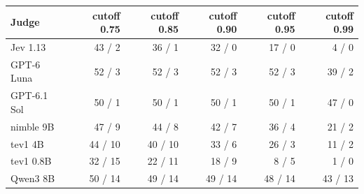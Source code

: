 \begin{tabular*}{\textwidth}{@{\extracolsep{\fill}}l rrrrr@{}}
\toprule
Judge & cutoff 0.75 & cutoff 0.85 & cutoff 0.90 & cutoff 0.95 & cutoff 0.99 \\
\midrule
Jev 1.13 & 43 / 2 & 36 / 1 & 32 / 0 & 17 / 0 & 4 / 0 \\
GPT-6 Luna & 52 / 3 & 52 / 3 & 52 / 3 & 52 / 3 & 39 / 2 \\
GPT-6.1 Sol & 50 / 1 & 50 / 1 & 50 / 1 & 50 / 1 & 47 / 0 \\
nimble 9B & 47 / 9 & 44 / 8 & 42 / 7 & 36 / 4 & 21 / 2 \\
tev1 4B & 44 / 10 & 40 / 10 & 33 / 6 & 26 / 3 & 11 / 2 \\
tev1 0.8B & 32 / 15 & 22 / 11 & 18 / 9 & 8 / 5 & 1 / 0 \\
Qwen3 8B & 50 / 14 & 49 / 14 & 49 / 14 & 48 / 14 & 43 / 13 \\
\bottomrule
\end{tabular*}
